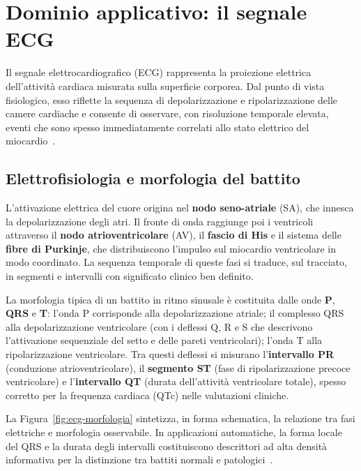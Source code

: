 \section{Dominio applicativo: il segnale ECG}\label{sec:dominio-applicativo}

Il segnale elettrocardiografico (ECG) rappresenta la proiezione elettrica dell'attività cardiaca misurata sulla superficie corporea.
Dal punto di vista fisiologico, esso riflette la sequenza di depolarizzazione e ripolarizzazione delle camere cardiache e consente di osservare, con risoluzione temporale elevata, eventi che sono spesso immediatamente correlati allo stato elettrico del miocardio~\cite{malmivuo1995bioelectromagnetism}.

\subsection{Elettrofisiologia e morfologia del battito}

L'attivazione elettrica del cuore origina nel \textbf{nodo seno-atriale} (SA), che innesca la depolarizzazione degli atri.
Il fronte di onda raggiunge poi i ventricoli attraverso il \textbf{nodo atrioventricolare} (AV), il \textbf{fascio di His} e il sistema delle \textbf{fibre di Purkinje}, che distribuiscono l'impulso sul miocardio ventricolare in modo coordinato.
La sequenza temporale di queste fasi si traduce, sul tracciato, in segmenti e intervalli con significato clinico ben definito.

La morfologia tipica di un battito in ritmo sinusale è costituita dalle onde \textbf{P}, \textbf{QRS} e \textbf{T}:
l'onda P corrisponde alla depolarizzazione atriale; il complesso QRS alla depolarizzazione ventricolare (con i deflessi Q, R e S che descrivono l'attivazione sequenziale del setto e delle pareti ventricolari); l'onda T alla ripolarizzazione ventricolare.
Tra questi deflessi si misurano l'\textbf{intervallo PR} (conduzione atrioventricolare), il \textbf{segmento ST} (fase di ripolarizzazione precoce ventricolare) e l'\textbf{intervallo QT} (durata dell'attività ventricolare totale), spesso corretto per la frequenza cardiaca (QTc) nelle valutazioni cliniche.

La Figura~\ref{fig:ecg-morfologia} sintetizza, in forma schematica, la relazione tra fasi elettriche e morfologia osservabile.
In applicazioni automatiche, la forma locale del QRS e la durata degli intervalli costituiscono descrittori ad alta densità informativa per la distinzione tra battiti normali e patologici~\cite{dechazal2004automatic}.

